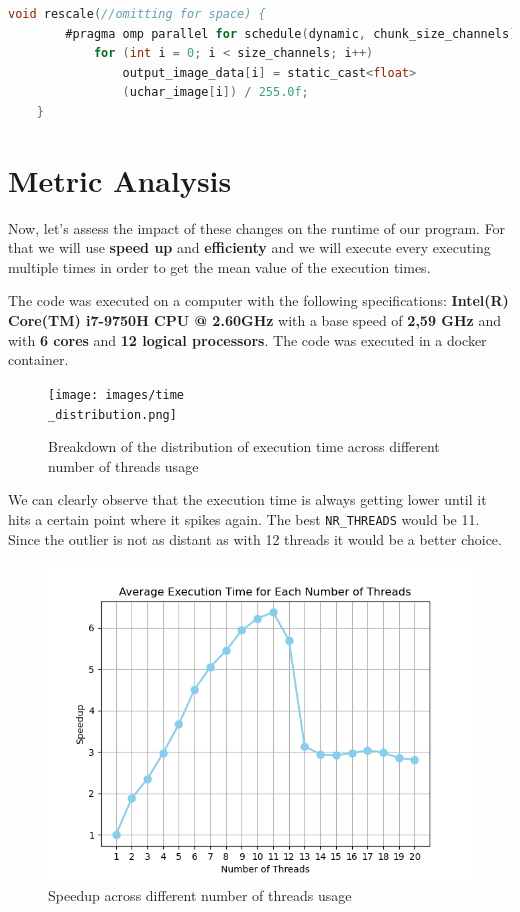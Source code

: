 \documentclass[sigconf]{acmart}
\begin{document}
\begin{lstlisting}[language=C, caption=Rescale Function]
	void rescale(//omitting for space) {
        #pragma omp parallel for schedule(dynamic, chunk_size_channels) num_threads(n_threads)
            for (int i = 0; i < size_channels; i++)
                output_image_data[i] = static_cast<float>
                (uchar_image[i]) / 255.0f;
    }
\end{lstlisting}
\section{Metric Analysis}
Now, let's assess the impact of these changes on the runtime of our program. For that we will use \textbf{speed up} and \textbf{efficienty} and we will execute every executing multiple times in order to get the mean value of the execution times.

The code was executed on a computer with the following specifications: \textbf{Intel(R) Core(TM) i7-9750H CPU @ 2.60GHz}
with a base speed of \textbf{2,59 GHz} and with \textbf{6 cores} and \textbf{12 logical processors}. The code was executed in a docker container.

\begin{figure}[h]
  \centering
  \texttt{[image: images/time\\\_distribution.png]}
  \caption{Breakdown of the distribution of execution time across different number of threads usage}
  \label{fig1}
\end{figure}

We can clearly observe that the execution time is always getting lower until it hits a certain point where it spikes again. The best \texttt{NR\_THREADS} would be 11. Since the outlier is not as distant as with 12 threads it would be a better choice.

\begin{figure}[h]
  \centering
  \includegraphics[width=\linewidth]{images/speedup2.png}
  \caption{Speedup across different number of threads usage}
\end{figure}
\end{document}
